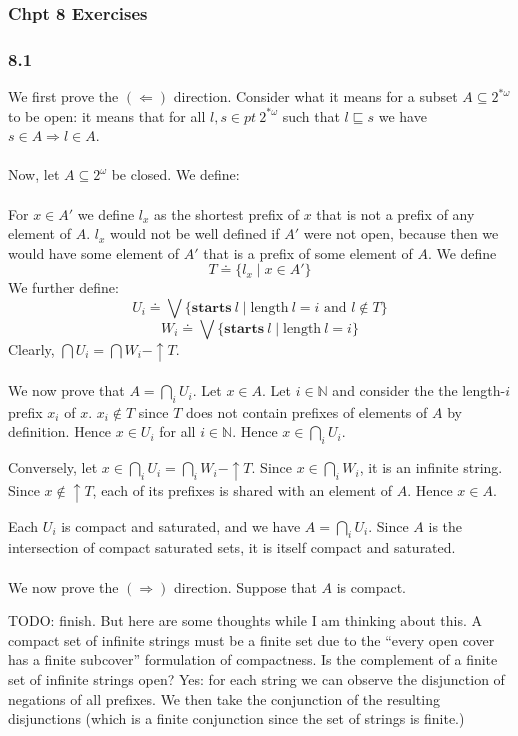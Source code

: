 \documentclass{article}
\newcommand{\mbf}{\mathbf}
\begin{document}
\subsubsection*{Chpt 8 Exercises}

\subsubsection*{8.1}
We first prove the $(\Leftarrow)$ direction. Consider what it means for a subset $A \subseteq 2^{* \omega}$ to be open: it means that for all $l,s \in \mathit{pt}~2^{* \omega}$ such that $l \sqsubseteq s$
we have $s \in A \Rightarrow l \in A$.\\~\\
Now, let $A \subseteq 2^{\omega}$ be closed. We define:\\~\\

For $x \in A'$ we define $l_x$ as the shortest prefix of $x$ that is not a prefix of any element of $A$. $l_x$ would not be well defined if $A'$ were not open, because then we would have some element of $A'$ that is a prefix of some element of $A$. We define
$$T \doteq \{ l_x \mid x \in A' \}$$
We further define:
$$U_i \doteq \bigvee \{ \mbf{starts}~l \mid \text{length}~l = i \text{ and } l \not \in T \} $$
$$W_i \doteq  \bigvee \{ \mbf{starts}~l \mid \text{length}~l = i \}$$
Clearly, $\bigcap U_i = \bigcap W_i - \uparrow T$.\\~\\
We now prove that $A = \bigcap_{i} U_i$. Let $x \in A$. Let $i \in \mathbb N$ and consider the the length-$i$ prefix $x_i$ of $x$. $x_i \not \in T$ since $T$ does not contain prefixes of elements of $A$ by definition. Hence $x \in U_i$ for all $i \in \mathbb N$. Hence $x \in \bigcap_{i} U_i$.

Conversely, let $x \in \bigcap_i U_i = \bigcap_i W_i - \uparrow T$. Since $x \in \bigcap_i W_i$, it is an infinite string. Since $x \not \in \uparrow T$, each of its prefixes is shared with an element of $A$. Hence $x \in A$.

Each $U_i$ is compact and saturated, and we have $A = \bigcap_{i} U_i$. Since $A$ is the intersection of compact saturated sets,
it is itself compact and saturated. \\~\\
We now prove the $(\Rightarrow)$ direction. Suppose that $A$ is compact.

TODO: finish. But here are some thoughts while I am thinking about this. A compact set of infinite strings must be a finite set due to the ``every open cover has a finite subcover'' formulation of compactness. Is the complement of a finite set of infinite strings open? Yes: for each string we can observe the disjunction of negations of all prefixes. We then take the conjunction of the resulting disjunctions (which is a finite conjunction since the set of strings is finite.)
\end{document}
